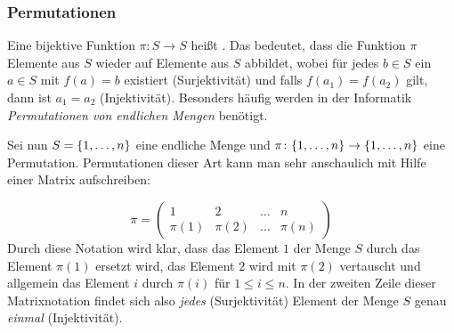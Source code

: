 \ifdiscretemath
%
%
\else

\subsubsection{Permutationen}
\label{Permutationen}
Eine bijektive Funktion $\pi \colon S \rightarrow S$
heißt \index{$\pi$}. Das bedeutet, dass die
Funktion $\pi$ Elemente aus $S$ wieder auf Elemente aus $S$ abbildet,
wobei für jedes $b \in S$ ein $a \in S$ mit $f(a) = b$ existiert
(Surjektivität) und falls $f(a_1) = f(a_2)$ gilt, dann ist $a_1 = a_2$
(Injektivität). Besonders häufig werden in der
Informatik \emph{Permutationen von endlichen Mengen} benötigt.

Sei nun $S = \{1, \dots ,n\}$ eine endliche Menge und
$\pi \colon \{1, \dots ,n\} \rightarrow \{1, \dots ,n\}$ eine
Permutation. Permutationen dieser Art kann man sehr anschaulich mit
Hilfe einer Matrix aufschreiben:

\begin{displaymath}
\pi = \left( 
\begin{array}{cccc}
1 & 2 & \dots & n\\
\pi(1) & \pi(2) & \dots & \pi(n)
\end{array}
\right)
\end{displaymath}
Durch diese Notation wird klar, dass das Element $1$ der Menge $S$
durch das Element $\pi(1)$ ersetzt wird, das Element $2$ wird mit
$\pi(2)$ vertauscht und allgemein das Element $i$ durch $\pi(i)$ für
$1 \le i \le n$. In der zweiten Zeile dieser Matrixnotation findet
sich also \emph{jedes} (Surjektivität) Element der Menge $S$
genau \emph{einmal} (Injektivität).

